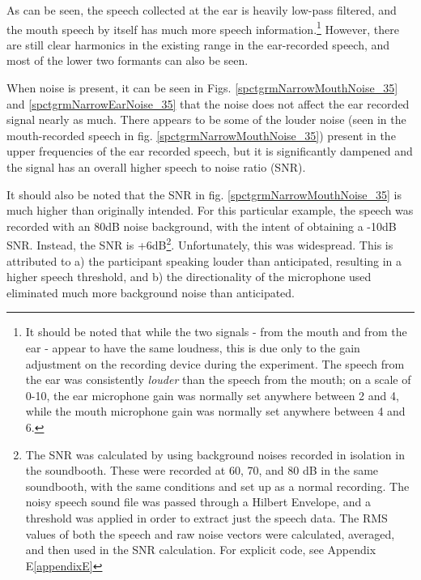 \documentclass[dissertation,copyright]{uathesis}
\begin{document}
As can be seen, the speech collected at the ear is heavily low-pass filtered, and the mouth speech by itself has much more speech information.\footnote{It should be noted that while the two signals - from the mouth and from the ear - appear to have the same loudness, this is due only to the gain adjustment on the recording device during the experiment.  The speech from the ear was consistently \textit{louder} than the speech from the mouth; on a scale of 0-10, the ear microphone gain was normally set anywhere between 2 and 4, while the mouth microphone gain was normally set anywhere between 4 and 6.}
However, there are still clear harmonics in the existing range in the ear-recorded speech, and most of the lower two formants can also be seen.

When noise is present, it can be seen in Figs. \ref{spctgrmNarrowMouthNoise_35} and \ref{spctgrmNarrowEarNoise_35} that the noise does not affect the ear recorded signal nearly as much.  There appears to be some of the louder noise (seen in the mouth-recorded speech in fig. \ref{spctgrmNarrowMouthNoise_35}) present in the upper frequencies of the ear recorded speech, but it is significantly dampened and the signal has an overall higher speech to noise ratio (SNR).

It should also be noted that the SNR in fig. \ref{spctgrmNarrowMouthNoise_35} is much higher than originally intended.  For this particular example, the speech was recorded with an 80dB noise background, with the intent of obtaining a -10dB SNR.  Instead, the SNR is +6dB\footnote{The SNR was calculated by using background noises recorded in isolation in the soundbooth.  These were recorded at 60, 70, and 80 dB in the same soundbooth, with the same conditions and set up as a normal recording.  The noisy speech sound file was passed through a Hilbert Envelope, and a threshold was applied in order to extract just the speech data.  The RMS values of both the speech and raw noise vectors were calculated, averaged, and then used in the SNR calculation.  For explicit code, see Appendix E\ref{appendixE}}.  Unfortunately, this was widespread. This is attributed to a) the participant speaking louder than anticipated, resulting in a higher speech threshold, and b) the directionality of the microphone used eliminated much more background noise than anticipated.
\end{document}
